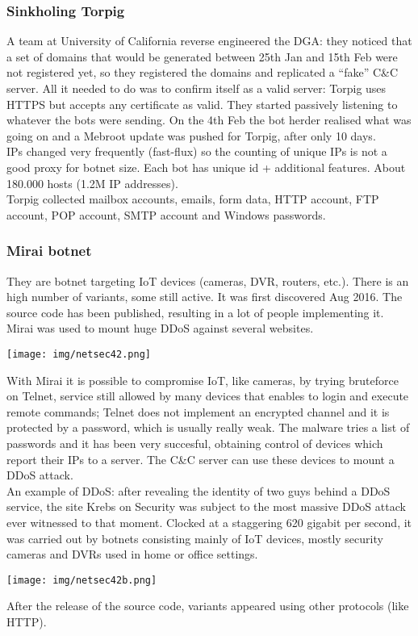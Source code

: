 \documentclass[a4paper, 10pt, titlepage]{article}
\begin{document}
\subsubsection*{Sinkholing Torpig}
A team at University of California reverse engineered the DGA: they noticed that a set of domains that would be generated between 25th Jan and 15th Feb were not registered yet, so they registered the domains and replicated a “fake” C\&C server. All it needed to do was to confirm itself as a valid server: Torpig uses HTTPS but accepts any certificate as valid. They started passively listening to whatever the bots were sending. On the 4th Feb the bot herder realised what was going on and a Mebroot update was pushed for Torpig, after only 10 days. \medskip\\
IPs changed very frequently (fast-flux) so the counting of unique IPs is not a good proxy for botnet size. Each bot has unique id +  additional features. About 180.000 hosts (1.2M IP addresses).\medskip\\
Torpig collected mailbox accounts, emails, form data, HTTP account, FTP account, POP account, SMTP account and Windows passwords.

\subsubsection{Mirai botnet}
They are botnet targeting IoT devices (cameras, DVR, routers, etc.). There is an high number of variants, some still active. It was first discovered Aug 2016. The source code has been published, resulting in a lot of people implementing it. Mirai was used to mount huge DDoS against several websites.
\begin{center}
	\texttt{[image: img/netsec42.png]}
\end{center}
With Mirai it is possible to compromise IoT, like cameras, by trying bruteforce on Telnet, service still allowed by many devices that enables to login and execute remote commands; Telnet does not implement an encrypted channel and it is protected by a password, which is usually really weak. The malware tries a list of passwords and it has been very succesful, obtaining control of devices which report their IPs to a server. The C\&C server can use these devices to mount a DDoS attack.\\
An example of DDoS: after revealing the identity of two guys behind a DDoS service, the site Krebs on Security was subject to the most massive DDoS attack ever witnessed to that moment. Clocked at a staggering 620 gigabit per second, it was carried out by botnets consisting mainly of IoT devices, mostly security cameras and DVRs used in home or office settings.
\begin{center}
	\texttt{[image: img/netsec42b.png]}
\end{center}
After the release of the source code, variants appeared using other protocols (like HTTP).
\end{document}
